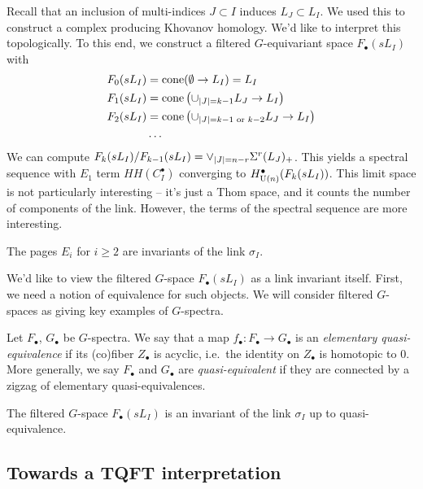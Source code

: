 Recall that an inclusion of multi-indices $J \subset I$ induces $L_J \subset L_I$.
We used this to construct a complex producing Khovanov homology.
We'd like to interpret this topologically.
To this end, we construct a filtered $G$-equivariant space $F_\bullet(sL_I)$ with 
\begin{align*}
	F_0(sL_I) &= \operatorname{cone}(\emptyset \to L_I) = L_I \\
	F_1(sL_I) &= \operatorname{cone}\left(\cup_{|J|=k-1} L_J \to L_I\right) \\
	F_2(sL_I) &= \operatorname{cone}\left(\cup_{|J|=k-1 \textrm{ or } k-2} L_J \to L_I\right) \\
		  &\dots
\end{align*}
We can compute $F_k(sL_I) / F_{k-1}(sL_I) = \vee_{\left|{J}\right|=n-r} \Sigma^r (L_{J})_+$.
This yields a spectral sequence with $E_1$ term $HH(C_I^\bullet)$ converging to $H^\bullet_{\mathrm{U}(n)}(F_k(sL_I))$.
This limit space is not particularly interesting -- it's just a Thom space, and it counts the number of components of the link.
However, the terms of the spectral sequence are more interesting.

\begin{thm}
	The pages $E_i$ for $i \geq 2$ are invariants of the link $\sigma_I$.
\end{thm}

We'd like to view the filtered $G$-space $F_\bullet(sL_I)$ as a link invariant itself.
First, we need a notion of equivalence for such objects.
We will consider filtered $G$-spaces as giving key examples of $G$-spectra.

\begin{dfn}
	Let $F_\bullet$, $G_\bullet$ be $G$-spectra.
	We say that a map $f_\bullet: F_\bullet \to G_\bullet$ is an \emph{elementary quasi-equivalence} if its (co)fiber $Z_\bullet$ is acyclic, i.e.\ the identity on $Z_\bullet$ is homotopic to $0$.
	More generally, we say $F_\bullet$ and $G_\bullet$ are \emph{quasi-equivalent} if they are connected by a zigzag of elementary quasi-equivalences.
\end{dfn}

\begin{thm}
	The filtered $G$-space $F_\bullet(sL_I)$ is an invariant of the link $\sigma_I$ up to quasi-equivalence.
\end{thm}

\subsection{Towards a TQFT interpretation}

